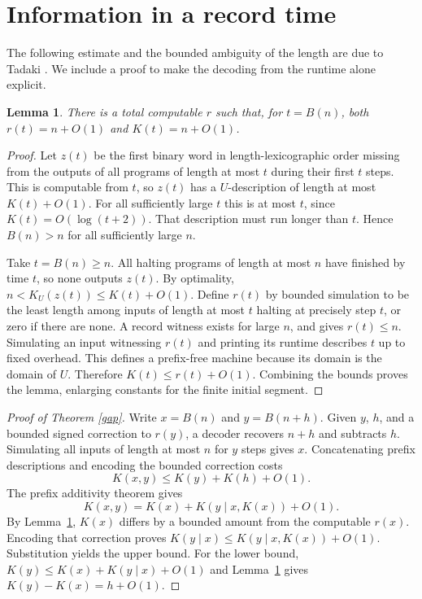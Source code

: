 \documentclass[11pt]{article}
\newtheorem{lemma}[theorem]{Lemma}
\newcommand{\BB}{B}
\begin{document}
\section*{Information in a record time}
The following estimate and the bounded ambiguity of the length are due to Tadaki \cite[Theorem 3.9 and its proof]{tadaki}. We include a proof to make the decoding from the runtime alone explicit.

\begin{lemma}\label{rank}
There is a total computable $r$ such that, for $t=\BB(n)$, both $r(t)=n+O(1)$ and $K(t)=n+O(1)$.
\end{lemma}
\begin{proof}
Let $z(t)$ be the first binary word in length-lexicographic order missing from the outputs of all programs of length at most $t$ during their first $t$ steps. This is computable from $t$, so $z(t)$ has a $U$-description of length at most $K(t)+O(1)$. For all sufficiently large $t$ this is at most $t$, since $K(t)=O(\log(t+2))$. That description must run longer than $t$. Hence $\BB(n)>n$ for all sufficiently large $n$.

Take $t=\BB(n)\ge n$. All halting programs of length at most $n$ have finished by time $t$, so none outputs $z(t)$. By optimality, $n<K_U(z(t))\le K(t)+O(1)$. Define $r(t)$ by bounded simulation to be the least length among inputs of length at most $t$ halting at precisely step $t$, or zero if there are none. A record witness exists for large $n$, and gives $r(t)\le n$. Simulating an input witnessing $r(t)$ and printing its runtime describes $t$ up to fixed overhead. This defines a prefix-free machine because its domain is the domain of $U$. Therefore $K(t)\le r(t)+O(1)$. Combining the bounds proves the lemma, enlarging constants for the finite initial segment.
\end{proof}

\begin{proof}[Proof of Theorem \ref{gap}]
Write $x=\BB(n)$ and $y=\BB(n+h)$. Given $y$, $h$, and a bounded signed correction to $r(y)$, a decoder recovers $n+h$ and subtracts $h$. Simulating all inputs of length at most $n$ for $y$ steps gives $x$. Concatenating prefix descriptions and encoding the bounded correction costs
\[
 K(x,y)\le K(y)+K(h)+O(1).
\]
The prefix additivity theorem \cite{kolm} gives
\[
 K(x,y)=K(x)+K(y\mid x,K(x))+O(1).
\]
By Lemma~\ref{rank}, $K(x)$ differs by a bounded amount from the computable $r(x)$. Encoding that correction proves $K(y\mid x)\le K(y\mid x,K(x))+O(1)$. Substitution yields the upper bound. For the lower bound, $K(y)\le K(x)+K(y\mid x)+O(1)$ and Lemma~\ref{rank} gives $K(y)-K(x)=h+O(1)$.
\end{proof}
\end{document}
